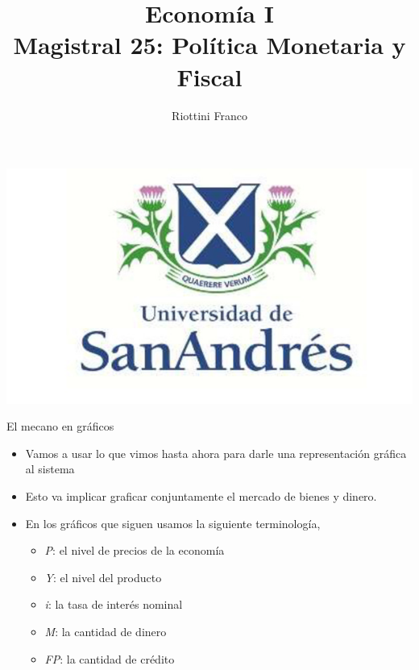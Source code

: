\documentclass{beamer}
\title[Economía I]{Economía I \vspace{4mm}
\\ Magistral 25: Política Monetaria y Fiscal}
\date{}
\author[Franco Riottini]{Riottini Franco}
\institute[]{Universidad de San Andrés}
\begin{document}
\begin{frame}
\titlepage
\centering

\includegraphics[scale=0.2]{../Figures/logoUDESA.jpg} 
\end{frame}

\begin{frame}{El mecano en gráficos}

\begin{itemize}
    \item Vamos a usar lo que vimos hasta ahora para darle una representación gráfica al sistema 
    \item Esto va implicar graficar conjuntamente el mercado de bienes y dinero.
    \item En los gráficos que siguen usamos la siguiente terminología, 
    \begin{itemize}
        \item \textit{P}: el nivel de precios de la economía
        \item \textit{Y}: el nivel del producto
        \item \textit{i}: la tasa de interés nominal
        \item \textit{M}: la cantidad de dinero
        \item \textit{FP}: la cantidad de crédito
    \end{itemize}
\end{itemize}
\end{frame}
\end{document}
